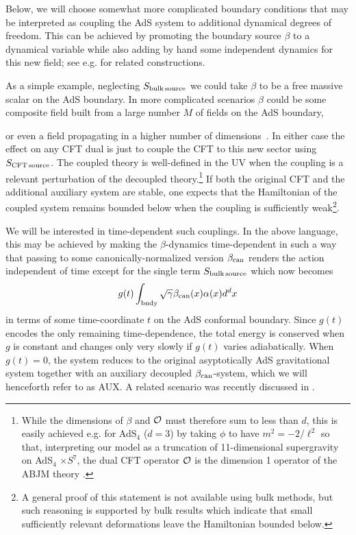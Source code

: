 \documentclass[12pt]{article}
\newcommand{\be}{\begin{equation}}
\newcommand{\ee}{\end{equation}}
\begin{document}
{Below, we will choose somewhat more complicated boundary conditions that may be interpreted as coupling the AdS system to additional dynamical degrees of freedom.  This can be achieved by promoting the boundary source {$\beta$} %
to a dynamical variable while also adding by hand some independent dynamics for this new field; {see e.g.\cite{Witten:2003ya,Rocha:2008fe,Compere:2008us,Domenech:2010nf,Faulkner:2010tq,Andrade:2011dg} for related constructions}.

As a simple example, neglecting $S_{\rm bulk \,source}$ we could take $\beta$ to be a free massive scalar on the AdS boundary.  In more complicated scenarios $\beta$ could be some composite field built from a large number $M$ of fields on the AdS boundary, {or even a field propagating in a higher number of dimensions~\cite{Rocha:2008fe}.  In either case the effect on any CFT dual is just to couple the CFT to this new sector using $S_{\rm CFT \, source}$.  The coupled theory is well-defined in the UV when the coupling is a relevant perturbation of the decoupled theory.\footnote{While the dimensions of $\beta$  and ${\cal O}$ must therefore sum to less than $d$,   this is easily achieved e.g. for AdS${}_4$ ($d=3$) by taking $\phi$ to have $m^2 = -2/\ell^2$
 so that, interpreting our model as a truncation of 11-dimensional supergravity on AdS${}_4$ $\times S^7$, the dual CFT operator ${\cal O}$ is the dimension 1 operator of the ABJM theory \cite{Aharony:2008ug}.}  If both the original CFT and the additional auxiliary system are stable, one expects that the Hamiltonian of the coupled system remains bounded below when the coupling is sufficiently weak\footnote{A general proof of this statement is not available using bulk methods, but such reasoning is supported by bulk results \cite{positive} which indicate that small sufficiently relevant deformations leave the Hamiltonian bounded below.}.

We will be interested in time-dependent such couplings.  In the above language, this may be achieved by making the $\beta$-dynamics time-dependent in such a way that passing to some canonically-normalized version {$\beta_{\rm can}$} renders the action independent of time except for the single term $S_{\rm bulk \, source}$ which now becomes
\be
g(t) \int_{\rm bndy} \sqrt{\gamma} \beta_{\rm can}(x) \alpha(x) d^dx
\ee
 in terms of some time-coordinate $t$ on the AdS conformal boundary. Since $g(t)$ encodes the only remaining time-dependence, the total energy is conserved when $g$ is constant and changes only very slowly if $g(t)$ varies adiabatically.  When $g(t) =0$, the system reduces to the original asyptotically AdS gravitational system together with an auxiliary decoupled {$\beta_{\rm can}$-system}, which we will henceforth refer to as AUX. A related scenario was recently discussed in \cite{Avery:2013exa}.

}}
\end{document}
